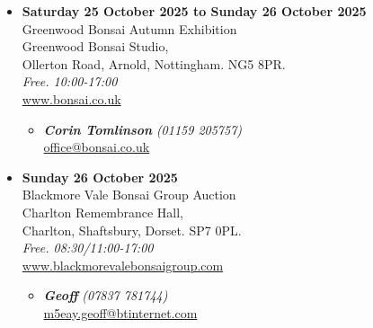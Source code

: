 \begin{itemize}
    \item \textbf{Saturday 25 October 2025 to Sunday 26 October 2025}
    \\
    Greenwood Bonsai Autumn Exhibition \\
    Greenwood Bonsai Studio, \\
    Ollerton Road, Arnold, Nottingham. NG5 8PR.
    \\
    \emph{Free. 10:00-17:00}
    \\
    \href{https://www.bonsai.co.uk}{www.bonsai.co.uk}
    \begin{itemize}
        \item \textbf{\emph{Corin Tomlinson}} \emph{(01159 205757)} \\
        \href{mailto:office@bonsai.co.uk}{office@bonsai.co.uk} 
    \end{itemize}

    \item \textbf{Sunday 26 October 2025}
    \\
    Blackmore Vale Bonsai Group Auction \\
    Charlton Remembrance Hall, \\
    Charlton, Shaftsbury, Dorset. SP7 0PL.
    \\
    \emph{Free. 08:30/11:00-17:00}
    \\
    \href{https://www.blackmorevalebonsaigroup.com}{www.blackmorevalebonsaigroup.com}
    \begin{itemize}
        \item \textbf{\emph{Geoff}} \emph{(07837 781744)} \\
        \href{mailto:m5eay.geoff@btinternet.com}{m5eay.geoff@btinternet.com} 
    \end{itemize}
\end{itemize}
\closearticle
